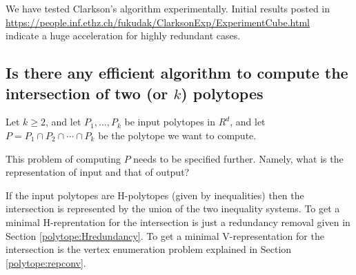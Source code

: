 \documentclass[a4paper,12pt]{article}
\begin{document}
We have tested Clarkson's algorithm \cite{c-mosga-94} 
 experimentally.  Initial results posted in 
\url{https://people.inf.ethz.ch/fukudak/ClarksonExp/ExperimentCube.html}\\
indicate a huge acceleration for highly redundant cases. 




\subsection{Is there any efficient algorithm to compute
the intersection of two (or $k$) polytopes}
\label{polytope:kintersection}

Let $k \ge 2$, and let $P_1, \ldots, P_k$ be input polytopes
in $R^d$, and let $P=P_1 \cap P_2 \cap \cdots \cap P_k$ be
the polytope we want to compute.

This problem of computing $P$ needs to be specified further.  Namely,
what is the representation of input and that of output?

If the input polytopes are H-polytopes (given by inequalities)
then the intersection is represented by the union of
the two inequality systems.  To get a minimal H-reprentation
for the intersection is just a redundancy removal given
in Section \ref{polytope:Hredundancy}.  To get a minimal V-representation
for the intersection is the vertex enumeration problem explained
in Section \ref{polytope:repconv}.
\end{document}
